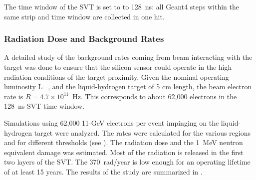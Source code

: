 The time window  of the SVT is set to to 128~ns: all Geant4 steps within the same strip and time window are collected
in one hit.

\subsubsection{Radiation Dose and Background Rates}

A detailed study of the background rates coming from beam interacting with the target was done to ensure that the
silicon sensor could operate in the high radiation conditions of the target proximity. Given the nominal operating
luminosity L=\cLuminosity, and the liquid-hydrogen target of 5 cm length, the beam electron rate is
$R=4.7 \times 10^{11}$~Hz. This corresponds to about 62,000 electrons in the 128~ns SVT time window.

Simulations using 62,000 11-GeV electrons per event impinging on the liquid-hydrogen target were analyzed.
The rates were calculated for the various regions and for different thresholds (see ).
The radiation dose and the 1~MeV neutron equivalent damage was estimated. Most of the radiation
is released in the first two layers of the SVT. The 370~rad/year is low enough for an operating lifetime of at least
15 years. The results of the study are summarized in .

